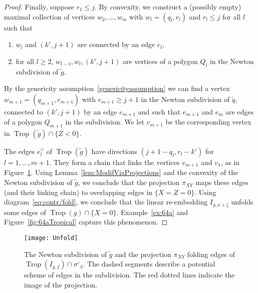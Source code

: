 \documentclass[11pt]{amsart}
\numberwithin{equation}{section}
\theoremstyle{plain}
\theoremstyle{definition}
\theoremstyle{remark}
\begin{document}
\begin{proof}
  Finally, suppose $r_1\leq j$.  By convexity, we construct a
  (possibly empty) maximal collection of vertices $w_2,\ldots,w_m$
  with $w_l=(q_l,r_l)$ and $r_l\leq j$ for all $l$ such that
  \begin{enumerate}[(1)]
\item $w_l$ and $(k', j+1)$ are connected by an edge $e_l$,
\item for all $l\geq 2$, $w_{l-1},w_{l}, (k',j+1)$ are vertices of a polygon $Q_l$ in the Newton subdivision of $\tilde{g}$.
\end{enumerate}
By the genericity assumption~\ref{genericityassumption} we can find a
vertex $w_{m+1}=(q_{m+1},r_{m+1})$ with $r_{m+1}\geq j+1$ in the
Newton subdivision of $\tilde{q}$, connected to $(k',j+1)$ by an edge
$e_{m+1}$ and such that $e_{m+1}$ and $e_m$ are edges of a polygon
$Q_{m+1}$ in the subdivision. We let $v_{m+1}$ be the corresponding
vertex in $\operatorname{Trop}(\tilde{g})\cap \{Z<0\}$.

The edges $e_l^{\vee}$ of $\operatorname{Trop}(\tilde{g})$ have directions
$(j+1-q_l, r_l-k')$ for $l=1,\ldots, m+1$. They form a chain that
links the vertices $v_{m+1}$ and $v_1$, as in
Figure~\ref{fig:folding}. Using Lemma~\ref{lem:ModifViaProjections}
and the convexity of the Newton subdivision of $\tilde{g}$, we
conclude that the projection $\pi_{XY}$ maps these edges (and their
linking chain) to overlapping edges in $\{X=Z=0\}$.
Using diagram~\eqref{eq:contr/fold}, we conclude that the linear re-embedding
$I_{g,x+{\zeta}}$ unfolds some edges of $\operatorname{Trop}(g)\cap
\{X=0\}$. Example~\ref{ex:64a} and Figure~\ref{fig:64aTropical}
capture this phenomenon.
\end{proof}
\begin{figure}
\texttt{[image: Unfold]}
\caption{The Newton subdivision of $\tilde{g}$ and the projection
  $\pi_{XY}$ folding edges of  $\operatorname{Trop}(I_{g,f})\cap {\sigma^{\circ}}_3$. The dashed
  segments describe a potential scheme of edges in the
  subdivision. The red dotted lines indicate the image of the
  projection.}\label{fig:folding}
\end{figure}
\end{document}
